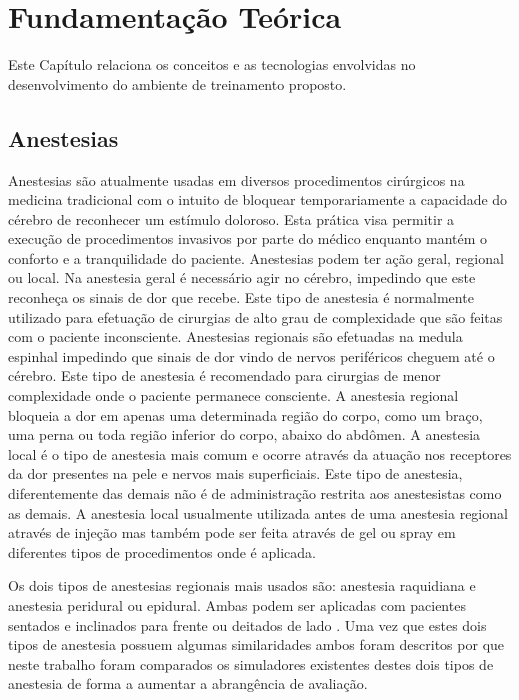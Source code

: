 \chapter{Fundamentação Teórica} \label{cap:cap2}

Este Capítulo relaciona os conceitos e as tecnologias envolvidas no desenvolvimento do ambiente de treinamento proposto. 

\section{Anestesias}

Anestesias são atualmente usadas em diversos procedimentos cirúrgicos na medicina tradicional com o intuito de bloquear temporariamente a capacidade do cérebro de reconhecer um estímulo doloroso. Esta prática visa permitir a execução de procedimentos invasivos por parte do médico enquanto mantém o conforto e a tranquilidade do paciente. Anestesias podem ter ação geral, regional ou local. Na anestesia geral é necessário agir no cérebro, impedindo que este reconheça os sinais de dor que recebe. Este tipo de anestesia é normalmente utilizado para efetuação de cirurgias de alto grau de complexidade que são feitas com o paciente inconsciente. Anestesias regionais são efetuadas na medula espinhal impedindo que sinais de dor vindo de nervos periféricos cheguem até o cérebro. Este tipo de anestesia é recomendado para cirurgias de menor complexidade onde o paciente permanece consciente. A anestesia regional bloqueia a dor em apenas uma determinada região do corpo, como um braço, uma perna ou toda região inferior do corpo, abaixo do abdômen. A anestesia local é o tipo de anestesia mais comum e ocorre através da atuação nos receptores da dor presentes na pele e nervos mais superficiais. Este tipo de anestesia, diferentemente das demais não é de administração restrita aos anestesistas como as demais. A anestesia local usualmente utilizada antes de uma anestesia regional através de injeção mas também pode ser feita através de gel ou spray em diferentes tipos de procedimentos onde é aplicada\cite{Pinheiro2018}.

Os dois tipos de anestesias regionais mais usados são: anestesia raquidiana e anestesia peridural ou epidural. Ambas podem ser aplicadas com pacientes sentados e inclinados para frente ou deitados de lado \cite{Anesclin2019}. Uma vez que estes dois tipos de anestesia possuem algumas similaridades ambos foram descritos por que neste trabalho foram comparados os simuladores existentes destes dois tipos de anestesia de forma a aumentar a abrangência de avaliação.  

